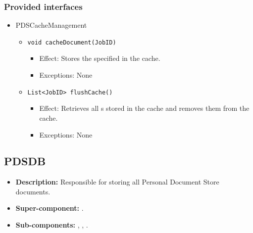 \subsubsection*{Provided interfaces}
\begin{itemize}
    \item PDSCacheManagement
    \begin{itemize}
        \item \texttt{void cacheDocument(JobID)}
        \begin{itemize}
            \item Effect: Stores the specified  in the cache.
            \item Exceptions: None
        \end{itemize}

        \item \texttt{List<JobID> flushCache()}
		    \begin{itemize}
                \item Effect: Retrieves all s stored in the cache and removes them from the cache.
                \item Exceptions: None
            \end{itemize}
    \end{itemize}
\end{itemize}

\subsection{PDSDB}
\begin{itemize}
    \item \textbf{Description:} Responsible for storing all Personal Document Store documents.
    \item \textbf{Super-component:} .
    \item \textbf{Sub-components:} , , .
\end{itemize}

